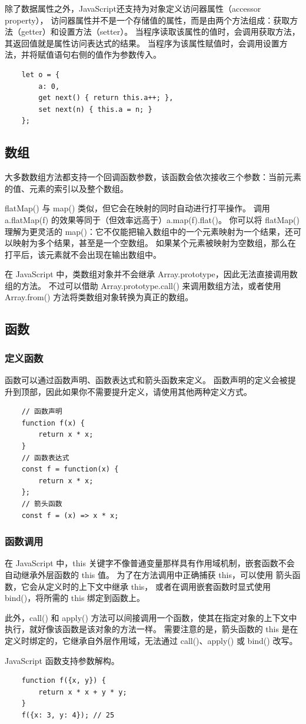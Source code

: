 除了数据属性之外，JavaScript还支持为对象定义访问器属性（accessor property），
访问器属性并不是一个存储值的属性，而是由两个方法组成：获取方法（getter）和设置方法（setter）。
当程序读取该属性的值时，会调用获取方法，其返回值就是属性访问表达式的结果。
当程序为该属性赋值时，会调用设置方法，并将赋值语句右侧的值作为参数传入。
\begin{verbatim}
    let o = {
        a: 0,
        get next() { return this.a++; },
        set next(n) { this.a = n; } 
    };
\end{verbatim}

\subsection{数组}
大多数数组方法都支持一个回调函数参数，该函数会依次接收三个参数：当前元素的值、元素的索引以及整个数组。

flatMap() 与 map() 类似，但它会在映射的同时自动进行打平操作。
调用 a.flatMap(f) 的效果等同于（但效率远高于）a.map(f).flat()。
你可以将 flatMap() 理解为更灵活的 map()：它不仅能把输入数组中的一个元素映射为一个结果，还可以映射为多个结果，甚至是一个空数组。
如果某个元素被映射为空数组，那么在打平后，该元素就不会出现在输出数组中。

在 JavaScript 中，类数组对象并不会继承 Array.prototype，因此无法直接调用数组的方法。
不过可以借助 Array.prototype.call() 来调用数组方法，或者使用 Array.from() 方法将类数组对象转换为真正的数组。

\subsection{函数}
\subsubsection{定义函数}
函数可以通过函数声明、函数表达式和箭头函数来定义。
函数声明的定义会被提升到顶部，因此如果你不需要提升定义，请使用其他两种定义方式。
\begin{verbatim}
    // 函数声明
    function f(x) {
        return x * x;
    }
    // 函数表达式
    const f = function(x) {
        return x * x;
    };
    // 箭头函数
    const f = (x) => x * x;
\end{verbatim}

\subsubsection{函数调用}
在 JavaScript 中，this 关键字不像普通变量那样具有作用域机制，嵌套函数不会自动继承外层函数的 this 值。
为了在方法调用中正确捕获 this，可以使用 箭头函数，它会从定义时的上下文中继承 this，
或者在调用嵌套函数时显式使用 bind()，将所需的 this 绑定到函数上。

此外，call() 和 apply() 方法可以间接调用一个函数，使其在指定对象的上下文中执行，就好像该函数是该对象的方法一样。
需要注意的是，箭头函数的 this 是在定义时绑定的，它继承自外层作用域，无法通过 call()、apply() 或 bind() 改写。

JavaScript 函数支持参数解构。
\begin{verbatim}
    function f({x, y}) {
        return x * x + y * y;
    }
    f({x: 3, y: 4}); // 25  
\end{verbatim}



